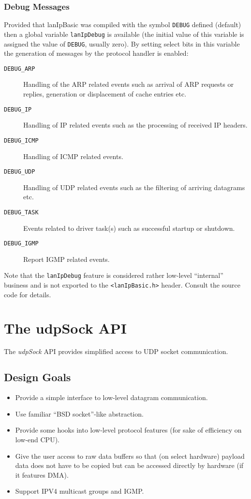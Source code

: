 \documentclass{article}
\newcommand{\lip}{lanIpBasic}
\newcommand{\lipc}[1]{{\tt #1}}
\begin{document}
  \subsubsection{Debug Messages}
  Provided that \lip{} was compiled with the symbol \lipc{DEBUG} defined (default)
  then a global variable \lipc{lanIpDebug} is available (the initial value
  of this variable is assigned the value of \lipc{DEBUG}, usually zero).
  By setting select bits in this variable the generation of messages by the
  protocol handler is enabled:
  \begin{description}
    \item[\lipc{DEBUG\_ARP}] Handling of the ARP related events such as
      arrival of ARP requests or replies, generation or displacement of
      cache entries etc.
    \item[\lipc{DEBUG\_IP}] Handling of IP related events such as the processing
      of received IP headers. 
    \item[\lipc{DEBUG\_ICMP}] Handling of ICMP related events.
    \item[\lipc{DEBUG\_UDP}] Handling of UDP related events such as the
      filtering of arriving datagrams etc.
    \item[\lipc{DEBUG\_TASK}] Events related to driver task(s) such as
      successful startup or shutdown.
    \item[\lipc{DEBUG\_IGMP}] Report IGMP related events.
  \end{description}
  Note that the \lipc{lanIpDebug} feature is considered rather low-level
  ``internal'' business
  and is not exported to the \lipc{<lanIpBasic.h>} header. Consult the
  source code for details.

\section{The udpSock API}
  The {\em udpSock} API provides simplified access to UDP socket
  communication.
  \subsection{Design Goals}
  \begin{itemize}
  \item Provide a simple interface to low-level datagram communication.
  \item Use familiar ``BSD socket''-like abstraction.
  \item Provide some hooks into low-level protocol features (for sake
        of efficiency on low-end CPU).
  \item Give the user access to raw data buffers so that (on select hardware)
        payload data does not have to be copied but can be accessed
        directly by hardware (if it features DMA). 
  \item Support IPV4 multicast groups and IGMP.
  \end{itemize}
\end{document}
